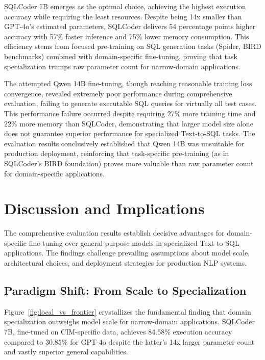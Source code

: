 SQLCoder 7B emerges as the optimal choice, achieving the highest execution accuracy while requiring the least resources. Despite being 14x smaller than GPT-4o's estimated parameters, SQLCoder delivers 54 percentage points higher accuracy with 57\% faster inference and 75\% lower memory consumption. This efficiency stems from focused pre-training on SQL generation tasks (Spider, BIRD benchmarks) combined with domain-specific fine-tuning, proving that task specialization trumps raw parameter count for narrow-domain applications.

The attempted Qwen 14B fine-tuning, though reaching reasonable training loss convergence, revealed extremely poor performance during comprehensive evaluation, failing to generate executable SQL queries for virtually all test cases. This performance failure occurred despite requiring 27\% more training time and 22\% more memory than SQLCoder, demonstrating that larger model size alone does not guarantee superior performance for specialized Text-to-SQL tasks. The evaluation results conclusively established that Qwen 14B was unsuitable for production deployment, reinforcing that task-specific pre-training (as in SQLCoder's BIRD foundation) proves more valuable than raw parameter count for domain-specific applications.




\section{Discussion and Implications}

The comprehensive evaluation results establish decisive advantages for domain-specific fine-tuning over general-purpose models in specialized Text-to-SQL applications. The findings challenge prevailing assumptions about model scale, architectural choices, and deployment strategies for production NLP systems.

\subsection{Paradigm Shift: From Scale to Specialization}

Figure~\ref{fig:local_vs_frontier} crystallizes the fundamental finding that domain specialization outweighs model scale for narrow-domain applications. SQLCoder 7B, fine-tuned on CIM-specific data, achieves 84.58\% execution accuracy compared to 30.85\% for GPT-4o despite the latter's 14x larger parameter count and vastly superior general capabilities.

